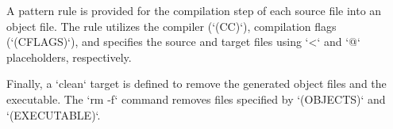 \documentclass[12pt]{article}
\begin{document}
A pattern rule is provided for the compilation step of each source file into an object file. The rule utilizes the compiler (`(CC)`), compilation flags (`(CFLAGS)`), and specifies the source and target files using `<` and `@` placeholders, respectively.

Finally, a `clean` target is defined to remove the generated object files and the executable. The `rm -f` command removes files specified by `(OBJECTS)` and `(EXECUTABLE)`.\\
\end{document}
